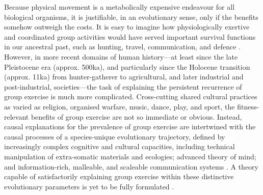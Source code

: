 Because physical movement is a metabolically expensive endeavour for all biological organisms, it is justifiable, in an evolutionary sense, only if the benefits somehow outweigh the costs. It is easy to imagine how physiologically exertive and coordinated group activities would have served important survival functions in our ancestral past, such as hunting, travel, communication, and defence \citep{Sands2010}. However, in more recent domains of human history---at least since the late Pleistocene era (approx. 500ka), and particularly since the Holocene transition (approx. 11ka) from hunter-gatherer to agricultural, and later industrial and post-industrial, societies---the task of explaining the persistent recurrence of group exercise is much more complicated.  Cross-cutting shared cultural practices as varied as religion, organised warfare, music, dance, play, and sport, the fitness-relevant benefits of group exercise are not so immediate or obvious.  Instead, causal explanations for the prevalence of group exercise are intertwined with the causal processes of a species-unique evolutionary trajectory, defined by increasingly complex cognitive and cultural capacities, including technical manipulation of extra-somatic materials and ecologies; advanced theory of mind; and information-rich, malleable, and scaleable communication systems \citep{Fuentes2016}.  A theory capable of satisfactorily explaining group exercise within these distinctive evolutionary parameters is yet to be fully formulated \citep{Cohen2017}.

